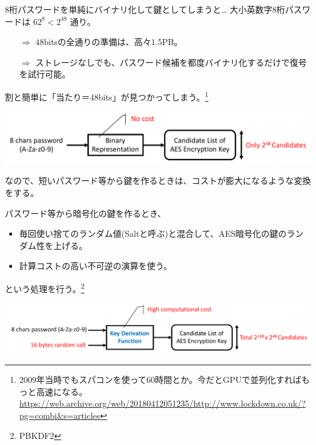 \documentclass[12pt,dvipdfmx]{beamer}
\begin{document}
\begin{frame}
\begin{block}{\small 8桁パスワードを単純にバイナリ化して鍵としてしまうと…}
大小英数字$8$桁パスワードは $62^8 < 2^{48}$ 通り。

\begin{itemize}
\item[$\Rightarrow$] $48$bitsの全通りの準備は、高々$1.5$PB。
\item[$\Rightarrow$] ストレージなしでも、パスワード候補を都度バイナリ化するだけで復号を試行可能。
\end{itemize}
\alert{割と簡単に「当たり＝48bits」が見つかってしまう}。\footnote[frame]{\scriptsize 2009年当時でもスパコンを使って60時間とか。今だとGPUで並列化すればもっと高速になる。\url{https://web.archive.org/web/20180412051235/http://www.lockdown.co.uk/?pg=combi&s=articles}}
\end{block}
\vspace{1ex}

\begin{center}
\includegraphics[width=0.9\linewidth]{Figs/kdf_weak.pdf}
\end{center}

\end{frame}

\begin{frame}

なので、短いパスワード等から鍵を作るときは、コストが膨大になるような変換をする。

\vspace{2ex}
\begin{block}{}
パスワード等から暗号化の鍵を作るとき、
\begin{itemize}
\item 毎回使い捨てのランダム値(Saltと呼ぶ)と混合して、\alert{AES暗号化の鍵のランダム性を上げる}。
\item \alert{計算コストの高い不可逆の演算}を使う。
\end{itemize}
という処理を行う。\footnote[frame]{PBKDF2}
\end{block}

\begin{center}
\includegraphics[width=\linewidth]{Figs/kdf_strong.pdf}
\end{center}

\end{frame}
\end{document}
